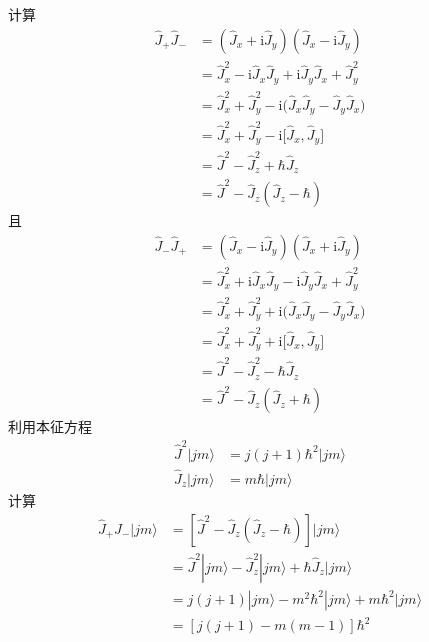计算
\begin{equation}
    \begin{aligned}
        \hat{J}_+\hat{J}_-&=(\hat{J}_x+\mathrm{i}\hat{J}_y)(\hat{J}_x-\mathrm{i}\hat{J}_y)
\\
&=\hat{J}_{x}^{2}-\mathrm{i}\hat{J}_x\hat{J}_y+\mathrm{i}\hat{J}_y\hat{J}_x+\hat{J}_{y}^{2}
\\
&=\hat{J}_{x}^{2}+\hat{J}_{y}^{2}-\mathrm{i(}\hat{J}_x\hat{J}_y-\hat{J}_y\hat{J}_x)
\\
&=\hat{J}_{x}^{2}+\hat{J}_{y}^{2}-\mathrm{i[}\hat{J}_x,\hat{J}_y]
\\
&=\hat{J}^2-\hat{J}_{z}^{2}+\hbar \hat{J}_z
\\
&=\hat{J}^2-\hat{J}_z(\hat{J}_z-\hbar )
    \end{aligned}
\end{equation}
且
\begin{equation}
    \begin{aligned}
        \hat{J}_-\hat{J}_+&=(\hat{J}_x-\mathrm{i}\hat{J}_y)(\hat{J}_x+\mathrm{i}\hat{J}_y)
\\
&=\hat{J}_{x}^{2}+\mathrm{i}\hat{J}_x\hat{J}_y-\mathrm{i}\hat{J}_y\hat{J}_x+\hat{J}_{y}^{2}
\\
&=\hat{J}_{x}^{2}+\hat{J}_{y}^{2}+\mathrm{i(}\hat{J}_x\hat{J}_y-\hat{J}_y\hat{J}_x)
\\
&=\hat{J}_{x}^{2}+\hat{J}_{y}^{2}+\mathrm{i[}\hat{J}_x,\hat{J}_y]
\\
&=\hat{J}^2-\hat{J}_{z}^{2}-\hbar \hat{J}_z
\\
&=\hat{J}^2-\hat{J}_z(\hat{J}_z+\hbar )
    \end{aligned}
\end{equation}
利用本征方程
\begin{equation}
    \begin{aligned}
        \hat{J}^2|jm\rangle &=j\left( j+1 \right) \hbar ^2|jm\rangle 
\\
\hat{J}_z|jm\rangle &=m\hbar |jm\rangle 
    \end{aligned}
\end{equation}
计算
\begin{equation}
    \begin{aligned}
        \hat{J}_+\hat{J}_-|jm\rangle &=[\hat{J}^2-\hat{J}_z(\hat{J}_z-\hbar )]|jm\rangle 
\\
&=\hat{J}^2|jm\rangle -\hat{J}_{z}^{2}|jm\rangle +\hbar \hat{J}_z|jm\rangle 
\\
&=j\left( j+1 \right) |jm\rangle -m^2\hbar ^2|jm\rangle +m\hbar ^2|jm\rangle 
\\
&=\left[ j\left( j+1 \right) -m\left( m-1 \right) \right] \hbar ^2
    \end{aligned}
\end{equation}
